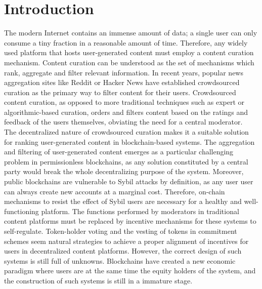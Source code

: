 \section{Introduction}
    
  The modern Internet contains an immense amount of data; a single user can only consume a tiny fraction in a reasonable amount of time. Therefore, any widely used platform that hosts user-generated content must employ a content curation mechanism. Content curation can be understood as the set of mechanisms which rank, aggregate and filter relevant information. In recent years, popular news aggregation sites like Reddit or Hacker News have established crowdsourced curation as the primary way to filter content for their users. Crowdsourced content curation, as opposed to more traditional techniques such as expert or algorithmic-based curation, orders and filters content based on the ratings and feedback of the users themselves, obviating the need for a central moderator.\\
  
  The decentralized nature of crowdsourced curation makes it a suitable solution for ranking user-generated content in blockchain-based systems. The aggregation and filtering of user-generated content emerges as a particular challenging problem in permissionless blockchains, as any solution constituted by a central party would break the whole decentralizing purpose of the system. Moreover, public blockchains are vulnerable to Sybil attacks by definition, as any user user can always create new accounts at a marginal cost. Therefore, on-chain mechanisms to resist the effect of Sybil users are necessary for a healthy and well-functioning platform. The functions performed by moderators in traditional content platforms must be replaced by incentive mechanisms for these systems to self-regulate. Token-holder voting and the vesting of tokens in commitment schemes seem natural strategies to achieve a proper alignment of incentives for users in decentralized content platforms. However, the correct design of such systems is still full of unknowns. Blockchains have created a new economic paradigm where users are at the same time the equity holders of the system, and the construction of such systems is still in a immature stage.\\
  
